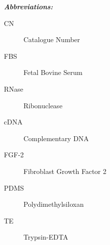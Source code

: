 \textit{\textbf{Abbreviations:}}
\begin{description}
\item[CN] Catalogue Number
\item[FBS] Fetal Bovine Serum
\item[RNase] Ribonuclease
\item[cDNA] Complementary DNA
\item[FGF-2] Fibroblast Growth Factor 2
\item[PDMS] Polydimethylsiloxan
\item[TE] Trypsin-EDTA

\end{description}